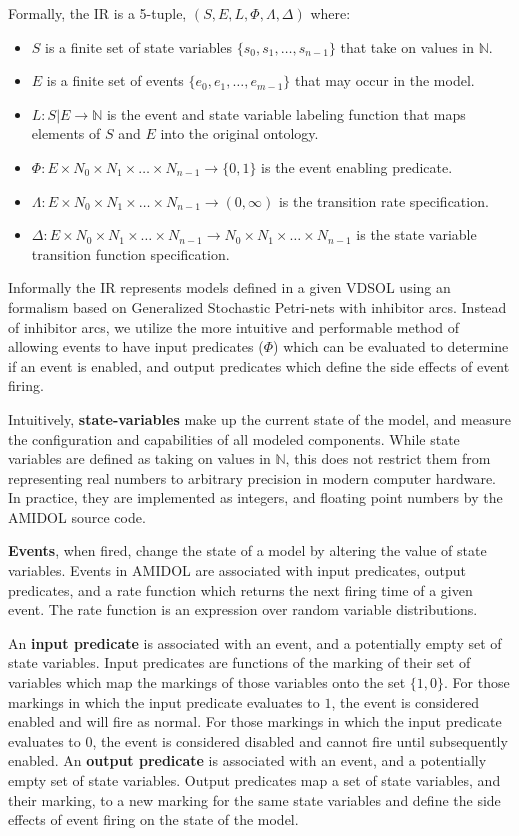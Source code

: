 \documentclass[11pt]{article}
\newcommand{\amidol}{\textsc{AMIDOL}}
\begin{document}
Formally, the IR is a 5-tuple, $(S, E, L, \Phi, \Lambda, \Delta)$ where:
\begin{itemize}
\item $S$ is a finite set of state variables $\{s_0, s_1, \ldots, s_{n-1}\}$ that take on values in $\mathbb{N}$.
\item $E$ is a finite set of events $\{e_0, e_1, \ldots, e_{m-1}\}$ that may occur in the model.
\item $L: S|E \rightarrow \mathbb{N}$ is the event and state variable labeling function that maps elements of $S$ and $E$ into the original ontology.
\item $\Phi: E \times N_0 \times N_1 \times \ldots \times N_{n-1} \rightarrow \{0, 1\}$ is the event enabling predicate.
\item $\Lambda: E \times N_0 \times N_1 \times \ldots \times N_{n-1} \rightarrow (0, \infty)$ is the transition rate specification.
\item $\Delta: E \times N_0 \times N_1 \times \ldots \times N_{n-1} \rightarrow N_0 \times N_1 \times \ldots \times N_{n-1}$ is the state variable transition function specification.
\end{itemize}

Informally the IR represents models defined in a given VDSOL using an formalism based on Generalized Stochastic Petri-nets with inhibitor arcs.  Instead of inhibitor arcs, we utilize the more intuitive and performable method of allowing events to have input predicates ($\Phi$) which can be evaluated to determine if an event is enabled, and output predicates which define the side effects of event firing.

Intuitively, \textbf{state-variables} make up the current state of the model, and measure the configuration and capabilities of all modeled components.  While state variables are defined as taking on values in $\mathbb{N}$, this does not restrict them from representing real numbers to arbitrary precision in modern computer hardware.  In practice, they are implemented as integers, and floating point numbers by the \amidol{} source code.

\textbf{Events}, when fired, change the state of a model by altering the value of state variables.  Events in \amidol{} are associated with input predicates, output predicates, and a rate function which returns the next firing time of a given event.  The rate function is an expression over random variable distributions.

An \textbf{input predicate} is associated with an event, and a potentially empty set of state variables.  Input predicates are functions of the marking of their set of variables which map the markings of those variables onto the set $\{1, 0\}$.  For those markings in which the input predicate evaluates to $1$, the event is considered enabled and will fire as normal.  For those markings in which the input predicate evaluates to $0$, the event is considered disabled and cannot fire until subsequently enabled.  An \textbf{output predicate} is associated with an event, and a potentially empty set of state variables.  Output predicates map a set of state variables, and their marking, to a new marking for the same state variables and define the side effects of event firing on the state of the model.
\end{document}
